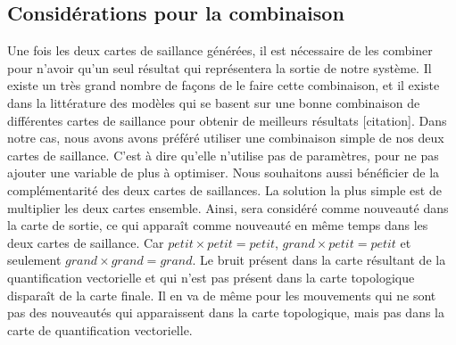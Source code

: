	\subsection{Considérations pour la combinaison}
	
	Une fois les deux cartes de saillance générées, il est nécessaire de les combiner pour n'avoir qu'un seul résultat qui représentera la sortie de notre système. Il existe un très grand nombre de façons de le faire cette combinaison, et il existe dans la littérature des modèles qui se basent sur une bonne combinaison de différentes cartes de saillance pour obtenir de meilleurs résultats [citation]. Dans notre cas, nous avons avons préféré utiliser une combinaison simple de nos deux cartes de saillance. C'est à dire qu'elle n'utilise pas de paramètres, pour ne pas ajouter une variable de plus à optimiser. Nous souhaitons aussi bénéficier de la complémentarité des deux cartes de saillances. La solution la plus simple est de multiplier les deux cartes ensemble. Ainsi, sera considéré comme nouveauté dans la carte de sortie, ce qui apparaît comme nouveauté en même temps dans les deux cartes de saillance. Car $\textit{petit} \times \textit{petit} = \textit{petit}$, $\textit{grand} \times \textit{petit} = \textit{petit}$ et seulement $\textit{grand} \times \textit{grand} = \textit{grand}$. Le bruit présent dans la carte résultant de la quantification vectorielle et qui n'est pas présent dans la carte topologique disparaît de la carte finale. Il en va de même pour les mouvements qui ne sont pas des nouveautés qui apparaissent dans la carte topologique, mais pas dans la carte de quantification vectorielle.

